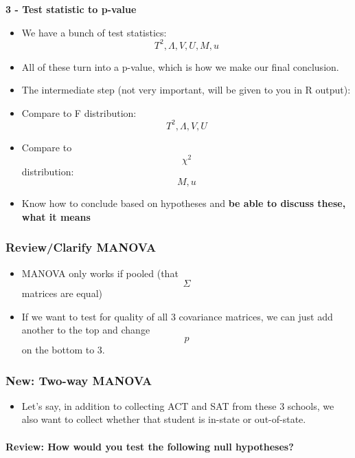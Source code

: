 \textbf{3 - Test statistic to p-value}

\begin{itemize}
\tightlist
\item
  We have a bunch of test statistics: \[T^2, \Lambda, V, U, M, u\]
\item
  All of these turn into a p-value, which is how we make our final
  conclusion.
\item
  The intermediate step (not very important, will be given to you in R
  output):
\item
  Compare to F distribution: \[T^2, \Lambda, V, U \]
\item
  Compare to \[ \chi^2 \] distribution: \[M, u\]
\item
  Know how to conclude based on hypotheses and \textbf{be able to
  discuss these, what it means}
\end{itemize}

\hypertarget{reviewclarify-manova}{%
\subsubsection{Review/Clarify MANOVA}\label{reviewclarify-manova}}

\begin{itemize}
\tightlist
\item
  MANOVA only works if pooled (that \[\Sigma\] matrices are equal)
\item
  If we want to test for quality of all 3 covariance matrices, we can
  just add another to the top and change \[p\] on the bottom to 3.
\end{itemize}

\hypertarget{new-two-way-manova}{%
\subsubsection{New: Two-way MANOVA}\label{new-two-way-manova}}

\begin{itemize}
\tightlist
\item
  Let's say, in addition to collecting ACT and SAT from these 3 schools,
  we also want to collect whether that student is in-state or
  out-of-state.
\end{itemize}

\hypertarget{review-how-would-you-test-the-following-null-hypotheses}{%
\paragraph{Review: How would you test the following null
hypotheses?}\label{review-how-would-you-test-the-following-null-hypotheses}}

